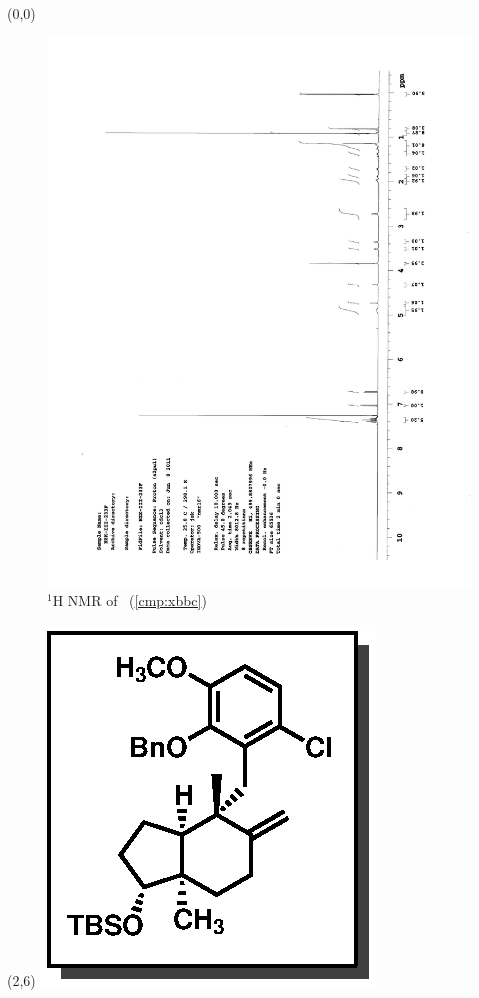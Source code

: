 \begin{textblock}{20}(0,0)
\begin{figure}[htb]
\caption{$^1$H NMR of \CMPxbbc\ (\ref{cmp:xbbc})}
\includegraphics[scale=0.75, trim = 0mm 0mm 0mm 5mm,
clip]{chp_singlecarbon/images/nmr/xbbcH}
\vspace{-100pt}
\end{figure}
\end{textblock}
\begin{textblock}{1}(2,6)
\includegraphics[scale=0.8, angle=90]{chp_singlecarbon/images/xbbc}
\end{textblock}
